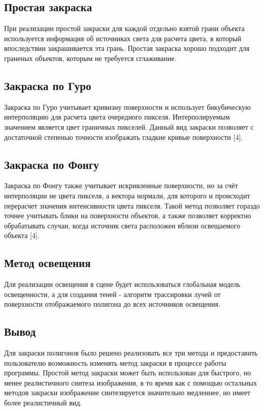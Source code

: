 \subsection{Простая закраска}

При реализации простой закраски для каждой отдельно взятой грани объекта используется информация об источниках света для расчета цвета, в который впоследствии закрашивается эта грань. Простая закраска хорошо подходит для граненых объектов, которым не требуется сглаживание.

\subsection{Закраска по Гуро}

Закраска по Гуро учитывает кривизну поверхности и использует бикубическую интерполяцию для расчета цвета очередного пикселя. Интерполируемым значением является цвет граничных пикселей. Данный вид закраски позволяет с достаточной степенью точности изображать гладкие кривые поверхности [4].

\subsection{Закраска по Фонгу}

Закраска по Фонгу также учитывает искривленные поверхности, но за счёт интерполяции не цвета пикселя, а вектора нормали, для которого и происходит перерасчет значения интенсивности цвета пикселя. Такой метод позволяет гораздо точнее учитывать блики на поверхности объектов, а также позволяет корректно обрабатывать случаи, когда источник света расположен вблизи освещаемого объекта [4].

\subsection{Метод освещения}

Для реализации освещения в сцене будет использоваться глобальная модель освещенности, а для создания теней - алгоритм трассировки лучей от поверхности отображаемого полигона до всех источников освещения.

\subsection{Вывод}

Для закраски полигонов было решено реализовать все три метода и предоставить пользователю  возможность изменять метод закраски в процессе работы программы. Простой метод закраски может быть использован для быстрого, но менее реалистичного синтеза изображения, в то время как с помощью остальных методов закраски изображение синтезируется значительно медленнее, но имеет более реалистичный вид.

